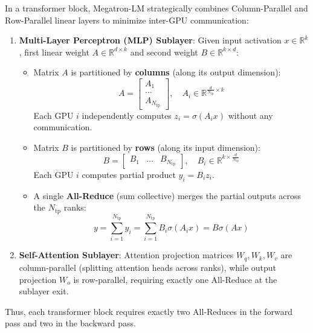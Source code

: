 \documentclass[11pt,a4paper]{article}
\theoremstyle{definition}
\begin{document}
In a transformer block, Megatron-LM strategically combines Column-Parallel and Row-Parallel linear layers to minimize inter-GPU communication:
\begin{enumerate}
    \item \textbf{Multi-Layer Perceptron (MLP) Sublayer}:
    Given input activation $x \in \mathbb{R}^k$, first linear weight $A \in \mathbb{R}^{d \times k}$ and second weight $B \in \mathbb{R}^{k \times d}$:
    \begin{itemize}
        \item Matrix $A$ is partitioned by \textbf{columns} (along its output dimension):
        {\boldmath
        \begin{equation}
        A = \begin{bmatrix} A_1 \\ \dots \\ A_{N_{\text{tp}}} \end{bmatrix}, \quad A_i \in \mathbb{R}^{\frac{d}{N_{\text{tp}}} \times k}
        \end{equation}
        }
        Each GPU $i$ independently computes $z_i = \sigma(A_i x)$ without any communication.
        \item Matrix $B$ is partitioned by \textbf{rows} (along its input dimension):
        {\boldmath
        \begin{equation}
        B = \begin{bmatrix} B_1 & \dots & B_{N_{\text{tp}}} \end{bmatrix}, \quad B_i \in \mathbb{R}^{k \times \frac{d}{N_{\text{tp}}}}
        \end{equation}
        }
        Each GPU $i$ computes partial product $y_i = B_i z_i$.
        \item A single \textbf{All-Reduce} (sum collective) merges the partial outputs across the $N_{\text{tp}}$ ranks:
        {\boldmath
        \begin{equation}
        y = \sum_{i=1}^{N_{\text{tp}}} y_i = \sum_{i=1}^{N_{\text{tp}}} B_i \sigma(A_i x) = B \sigma(A x)
        \end{equation}
        }
    \end{itemize}
    \item \textbf{Self-Attention Sublayer}:
    Attention projection matrices $W_q, W_k, W_v$ are column-parallel (splitting attention heads across ranks), while output projection $W_o$ is row-parallel, requiring exactly one All-Reduce at the sublayer exit.
\end{enumerate}
Thus, each transformer block requires exactly two All-Reduces in the forward pass and two in the backward pass.
\end{document}
